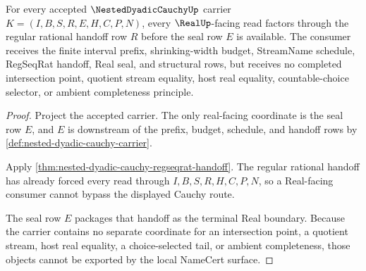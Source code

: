 \begin{theorem}
\label{thm:nested-dyadic-cauchy-real-seal-boundary}
For every accepted $\NestedDyadicCauchyUp$ carrier $K=(I,B,S,R,E,H,C,P,N)$, every $\RealUp$-facing read factors through the regular rational handoff row $R$ before the seal row $E$ is available. The consumer receives the finite interval prefix, shrinking-width budget, StreamName schedule, RegSeqRat handoff, Real seal, and structural rows, but receives no completed intersection point, quotient stream equality, host real equality, countable-choice selector, or ambient completeness principle.
\end{theorem}
\begin{proof}
Project the accepted carrier. The only real-facing coordinate is the seal row $E$, and $E$ is downstream of the prefix, budget, schedule, and handoff rows by \autoref{def:nested-dyadic-cauchy-carrier}.

Apply \autoref{thm:nested-dyadic-cauchy-regseqrat-handoff}. The regular rational handoff has already forced every read through $I,B,S,R,H,C,P,N$, so a Real-facing consumer cannot bypass the displayed Cauchy route.

The seal row $E$ packages that handoff as the terminal Real boundary. Because the carrier contains no separate coordinate for an intersection point, a quotient stream, host real equality, a choice-selected tail, or ambient completeness, those objects cannot be exported by the local NameCert surface.
\end{proof}


\begin{closurestatus}{\NestedDyadicCauchyUp}
  \theoryclosure{\obligationClosure}
  \formalstatus{\unformalizedV}
\end{closurestatus}
